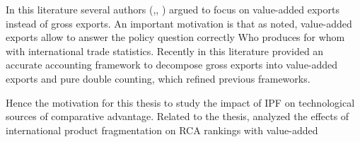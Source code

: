 In this literature several authors (\cite{johnson},\cite{daudin2011}, \cite{Koopman}) argued to focus on value-added exports instead of gross exports. An important motivation is that as \textcite{daudin2011} noted, value-added exports allow to answer the policy question correctly \textquotedbl{}Who produces for whom\textquotedbl{} with international trade statistics. Recently in this literature \textcite{Koopman} provided an accurate
accounting framework to decompose gross exports into value-added exports and pure double counting, which refined previous frameworks.%
 \par
 \par %
Hence the motivation for this thesis to study the impact of IPF on technological sources of comparative advantage. Related to the thesis, \textcite{Koopman} analyzed the effects of international product fragmentation on RCA rankings with  value-added
